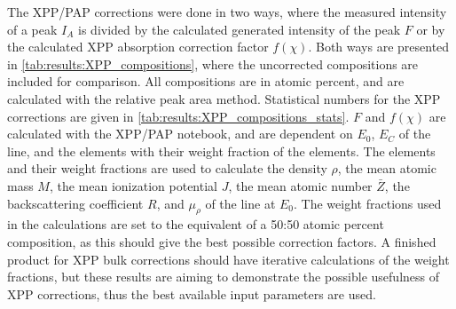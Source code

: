 

The XPP/PAP corrections were done in two ways, where the measured intensity of a peak $I_A$ is divided by the calculated generated intensity of the peak $F$ or by the calculated XPP absorption correction factor $f(\chi)$.
Both ways are presented in \cref{tab:results:XPP_compositions}, where the uncorrected compositions are included for comparison.
All compositions are in atomic percent, and are calculated with the relative peak area method.
Statistical numbers for the XPP corrections are given in \cref{tab:results:XPP_compositions_stats}.
$F$ and $f(\chi)$ are calculated with the XPP/PAP notebook, and are dependent on $E_0$, $E_C$ of the line, and the elements with their weight fraction of the elements.
The elements and their weight fractions are used to calculate the density $\rho$, the mean atomic mass $M$, the mean ionization potential $J$, the mean atomic number $\bar{Z}$, the backscattering coefficient $R$, and $\mu_\rho$ of the line at $E_0$.
The weight fractions used in the calculations are set to the equivalent of a 50:50 atomic percent composition, as this should give the best possible correction factors.
A finished product for XPP bulk corrections should have iterative calculations of the weight fractions, but these results are aiming to demonstrate the possible usefulness of XPP corrections, thus the best available input parameters are used.




























% 
% 
